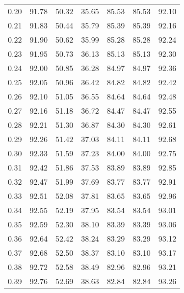 \begin{tabular}{|c|c|c|c|c|c|c|}
      0.20 &     91.78 &     50.32 &      35.65 &   85.53 &      85.53 &         92.10 \\
      0.21 &     91.83 &     50.44 &      35.79 &   85.39 &      85.39 &         92.16 \\
      0.22 &     91.90 &     50.62 &      35.99 &   85.28 &      85.28 &         92.24 \\
      0.23 &     91.95 &     50.73 &      36.13 &   85.13 &      85.13 &         92.30 \\
      0.24 &     92.00 &     50.85 &      36.28 &   84.97 &      84.97 &         92.36 \\
      0.25 &     92.05 &     50.96 &      36.42 &   84.82 &      84.82 &         92.42 \\
      0.26 &     92.10 &     51.05 &      36.55 &   84.64 &      84.64 &         92.48 \\
      0.27 &     92.16 &     51.18 &      36.72 &   84.47 &      84.47 &         92.55 \\
      0.28 &     92.21 &     51.30 &      36.87 &   84.30 &      84.30 &         92.61 \\
      0.29 &     92.26 &     51.42 &      37.03 &   84.11 &      84.11 &         92.68 \\
      0.30 &     92.33 &     51.59 &      37.23 &   84.00 &      84.00 &         92.75 \\
      0.31 &     92.42 &     51.86 &      37.53 &   83.89 &      83.89 &         92.85 \\
      0.32 &     92.47 &     51.99 &      37.69 &   83.77 &      83.77 &         92.91 \\
      0.33 &     92.51 &     52.08 &      37.81 &   83.65 &      83.65 &         92.96 \\
      0.34 &     92.55 &     52.19 &      37.95 &   83.54 &      83.54 &         93.01 \\
      0.35 &     92.59 &     52.30 &      38.10 &   83.39 &      83.39 &         93.06 \\
      0.36 &     92.64 &     52.42 &      38.24 &   83.29 &      83.29 &         93.12 \\
      0.37 &     92.68 &     52.50 &      38.37 &   83.10 &      83.10 &         93.17 \\
      0.38 &     92.72 &     52.58 &      38.49 &   82.96 &      82.96 &         93.21 \\
      0.39 &     92.76 &     52.69 &      38.63 &   82.84 &      82.84 &         93.26 \\

\end{tabular}
